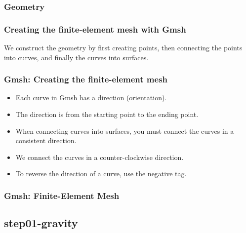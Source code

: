 \documentclass[aspectratio=169]{beamer}
\begin{document}
\begin{frame}
  \frametitle{Geometry}
  \summary{}

  
\end{frame}


\begin{frame}
  \frametitle{Creating the finite-element mesh with Gmsh}
  \summary{}

  We construct the geometry by first creating points, then connecting the points into curves, and finally the curves into surfaces.
  
  
\end{frame}


\begin{frame}
  \frametitle{Gmsh: Creating the finite-element mesh}
  \summary{}
  
  \begin{itemize}
  \item Each curve in Gmsh has a direction (orientation).
  \item The direction is from the starting point to the ending point.
  \item When connecting curves into surfaces, you must connect the curves in a consistent direction.
  \item We connect the curves in a counter-clockwise direction.
  \item To reverse the direction of a curve, use the negative tag.
  \end{itemize}
  
\end{frame}

\begin{frame}
  \frametitle{Gmsh: Finite-Element Mesh}

  
\end{frame}


\subsection{step01-gravity}
\end{document}
